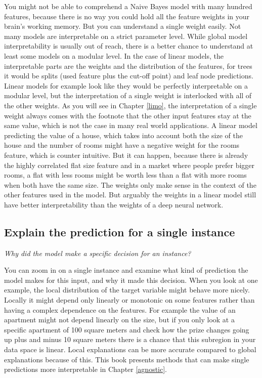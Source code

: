 \documentclass[12pt,]{krantz}
\theoremstyle{definition}
\theoremstyle{definition}
\theoremstyle{definition}
\theoremstyle{remark}
\begin{document}
You might not be able to comprehend a Naive Bayes model with many
hundred features, because there is no way you could hold all the feature
weights in your brain's working memory. But you can understand a single
weight easily. Not many models are interpretable on a strict parameter
level. While global model interpretability is usually out of reach,
there is a better chance to understand at least some models on a modular
level. In the case of linear models, the interpretable parts are the
weights and the distribution of the features, for trees it would be
splits (used feature plus the cut-off point) and leaf node predictions.
Linear models for example look like they would be perfectly
interpretable on a modular level, but the interpretation of a single
weight is interlocked with all of the other weights. As you will see in
Chapter \ref{limo}, the interpretation of a single weight always comes
with the footnote that the other input features stay at the same value,
which is not the case in many real world applications. A linear model
predicting the value of a house, which takes into account both the size
of the house and the number of rooms might have a negative weight for
the rooms feature, which is counter intuitive. But it can happen,
because there is already the highly correlated flat size feature and in
a market where people prefer bigger rooms, a flat with less rooms might
be worth less than a flat with more rooms when both have the same size.
The weights only make sense in the context of the other features used in
the model. But arguably the weights in a linear model still have better
interpretability than the weights of a deep neural network.

\subsection{Explain the prediction for a single
instance}\label{explain-the-prediction-for-a-single-instance}

\emph{Why did the model make a specific decision for an instance?}

You can zoom in on a single instance and examine what kind of prediction
the model makes for this input, and why it made this decision. When you
look at one example, the local distribution of the target variable might
behave more nicely. Locally it might depend only linearly or monotonic
on some features rather than having a complex dependence on the
features. For example the value of an apartment might not depend
linearly on the size, but if you only look at a specific apartment of
100 square meters and check how the prize changes going up plus and
minus 10 square meters there is a chance that this subregion in your
data space is linear. Local explanations can be more accurate compared
to global explanations because of this. This book presents methods that
can make single predictions more interpretable in Chapter
\ref{agnostic}.
\end{document}
